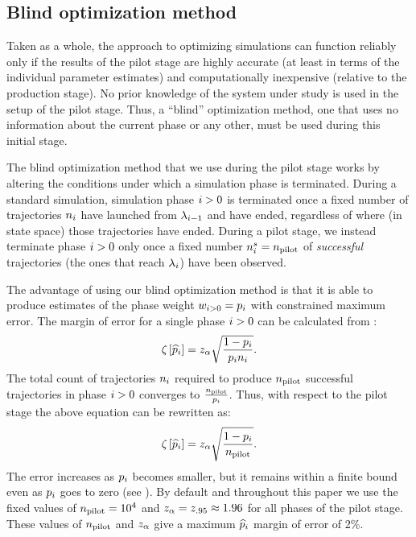 %
%
%
%

\subsection{Blind optimization method}
\label{sec:blind_opt}
Taken as a whole, the  approach to optimizing simulations can function reliably only if the results of the pilot stage are highly accurate (at least in terms of the individual parameter estimates) and computationally inexpensive (relative to the production stage). No prior knowledge of the system under study is used in the setup of the pilot stage. Thus, a ``blind'' optimization method, one that uses no information about the current phase or any other, must be used during this initial stage.

The blind optimization method that we use during the  pilot stage works by altering the conditions under which a simulation phase is terminated. During a standard  simulation, simulation phase $i>0$ is terminated once a fixed number of trajectories $n_{i}$ have launched from ${\lambda}_{i - 1}$ and have ended, regardless of where (in state space) those trajectories have ended. During a pilot stage, we instead terminate phase $i>0$ only once a fixed number $n_{i}^{s} = n_{\textrm{pilot}}$ of \textit{successful} trajectories (\ie the ones that reach ${\lambda}_{i}$) have been observed.

The advantage of using our blind optimization method is that it is able to produce estimates of the phase weight $w_{i>0} = p_{i}$ with constrained maximum error. The margin of error for a single phase $i>0$ can be calculated from :
    \begin{equation*}
        {\zeta}_{} \left[ \widehat{p}_{i} \right] = z_{\alpha} \sqrt{\frac{1 - p_{i}}{p_{i} n_{i}}}.
    \end{equation*}
The total count of trajectories $n_{i}$ required to produce $n_{\textrm{pilot}}$ successful trajectories in phase $i>0$ converges to $\frac{n_{\textrm{pilot}}}{p_{i}}$. Thus, with respect to the pilot stage the above equation can be rewritten as:
\begin{equation}
    \label{eq:blind_opt_moe}
        {\zeta}_{} \left[ \widehat{p}_{i} \right] = z_{\alpha} \sqrt{\frac{1 - p_{i}}{n_{\textrm{pilot}}}}.
    \end{equation}
The error increases as $p_{i}$ becomes smaller, but it remains within a finite bound even as $p_{i}$ goes to zero (see ). By default and throughout this paper we use the fixed values of $n_{\textrm{pilot}} = 10^4$ and $z_{\alpha} = z_{.95} \approx 1.96$ for all phases of the pilot stage. These values of $n_{\textrm{pilot}}$ and $z_{\alpha}$ give a maximum $\widehat{p}_{i}$ margin of error of 2\%.

